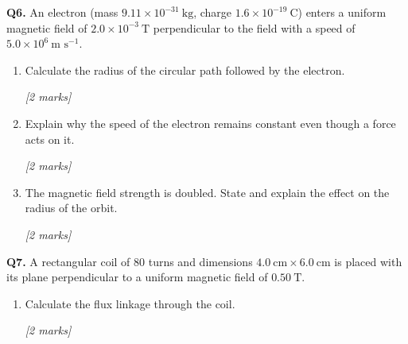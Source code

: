 \begin{tcolorbox}[colback=white, colframe=midblue, breakable]

\begin{minipage}{\linewidth}
\textbf{Q6.} An electron (mass $9.11\times10^{-31}\ \text{kg}$, charge $1.6\times10^{-19}\ \text{C}$) enters a uniform magnetic field of $2.0\times10^{-3}\ \text{T}$ perpendicular to the field with a speed of $5.0\times10^6\ \text{m s}^{-1}$.
\end{minipage}

\begin{enumerate}[label=(\alph*)]
  \item \begin{minipage}[t]{\linewidth}
  Calculate the radius of the circular path followed by the electron.
  \par\hfill\textit{[2 marks]}
  \vspace{3cm}
  \end{minipage}

  \item \begin{minipage}[t]{\linewidth}
  Explain why the speed of the electron remains constant even though a force acts on it.
  \par\hfill\textit{[2 marks]}
  \vspace{3cm}
  \end{minipage}

  \item \begin{minipage}[t]{\linewidth}
  The magnetic field strength is doubled. State and explain the effect on the radius of the orbit.
  \par\hfill\textit{[2 marks]}
  \vspace{3cm}
  \end{minipage}
\end{enumerate}

\begin{minipage}{\linewidth}
\textbf{Q7.} A rectangular coil of 80 turns and dimensions $4.0\ \text{cm} \times 6.0\ \text{cm}$ is placed with its plane perpendicular to a uniform magnetic field of $0.50\ \text{T}$.

\begin{enumerate}[label=(\alph*)]
  \item Calculate the flux linkage through the coil.
  \par\hfill\textit{[2 marks]}
  \vspace{3cm}


\end{enumerate}
\end{minipage}
\end{tcolorbox}
